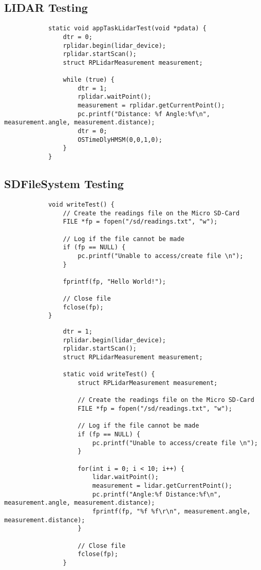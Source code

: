 			\subsection{LIDAR Testing}
			\label{testcode:observation1}
			\begin{lstlisting}
			static void appTaskLidarTest(void *pdata) {
				dtr = 0;
				rplidar.begin(lidar_device);
				rplidar.startScan();
				struct RPLidarMeasurement measurement;
				
				while (true) {
					dtr = 1;
					rplidar.waitPoint();
					measurement = rplidar.getCurrentPoint();
					pc.printf("Distance: %f Angle:%f\n", measurement.angle, measurement.distance);
					dtr = 0;
					OSTimeDlyHMSM(0,0,1,0);
				}
			}
			\end{lstlisting}
			
			\subsection{SDFileSystem Testing}
			\label{testcode:filewriting1}
			\begin{lstlisting}
			void writeTest() {
				// Create the readings file on the Micro SD-Card
				FILE *fp = fopen("/sd/readings.txt", "w");
				
				// Log if the file cannot be made
				if (fp == NULL) {
					pc.printf("Unable to access/create file \n");
				}
				
				fprintf(fp, "Hello World!");
				
				// Close file
				fclose(fp);
			}
			\end{lstlisting}
			
			\label{testcode:filewriting2}
			\begin{lstlisting}
				dtr = 1;
				rplidar.begin(lidar_device);
				rplidar.startScan();
				struct RPLidarMeasurement measurement;
				
				static void writeTest() {
					struct RPLidarMeasurement measurement;

					// Create the readings file on the Micro SD-Card
					FILE *fp = fopen("/sd/readings.txt", "w");
					
					// Log if the file cannot be made
					if (fp == NULL) {
						pc.printf("Unable to access/create file \n");
					}

					for(int i = 0; i < 10; i++) {
						lidar.waitPoint();
						measurement = lidar.getCurrentPoint();
						pc.printf("Angle:%f Distance:%f\n", measurement.angle, measurement.distance);
						fprintf(fp, "%f %f\r\n", measurement.angle, measurement.distance);
					}
					
					// Close file
					fclose(fp);
				}
			\end{lstlisting}
			
